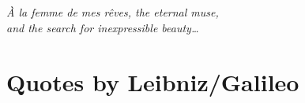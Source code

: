 \documentclass[12pt]{book}
\begin{document}
\section*{}
\section*{}
\section*{}
\begin{center}
\emph{\`A la femme de mes r\^eves, the eternal muse,\\ and the search for inexpressible beauty\ldots}
\end{center}

\tableofcontents

\chapter*{Quotes by Leibniz/Galileo}
\end{document}
